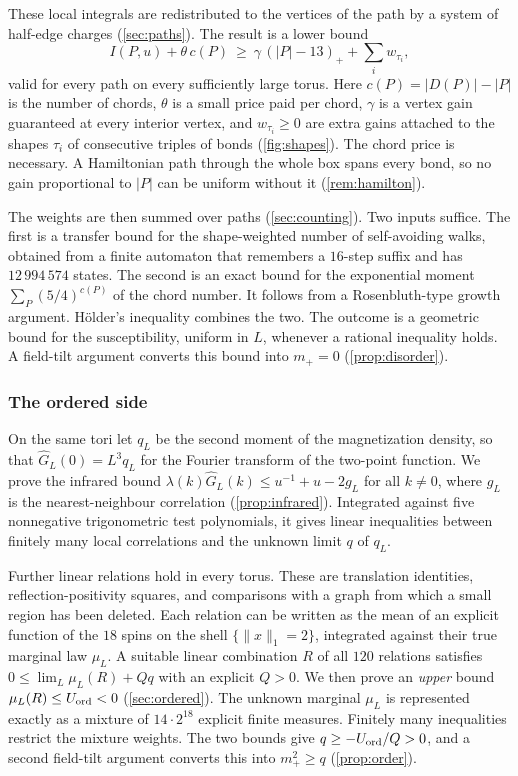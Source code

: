 These local integrals are redistributed to the vertices of the path by a system of half-edge charges (\cref{sec:paths}). The result is a lower bound
\[
 I(P,u)+\theta\,c(P)\ \ge\ \gamma\,(|P|-13)_+ +\sum_i w_{\tau_i},
\]
valid for every path on every sufficiently large torus. Here $c(P)=|D(P)|-|P|$ is the number of chords, $\theta$ is a small price paid per chord, $\gamma$ is a vertex gain guaranteed at every interior vertex, and $w_{\tau_i}\ge0$ are extra gains attached to the shapes $\tau_i$ of consecutive triples of bonds (\cref{fig:shapes}). The chord price is necessary. A Hamiltonian path through the whole box spans every bond, so no gain proportional to $|P|$ can be uniform without it (\cref{rem:hamilton}).

The weights are then summed over paths (\cref{sec:counting}). Two inputs suffice. The first is a transfer bound for the shape-weighted number of self-avoiding walks, obtained from a finite automaton that remembers a $16$-step suffix and has $12\,994\,574$ states. The second is an exact bound for the exponential moment $\sum_P(5/4)^{c(P)}$ of the chord number. It follows from a Rosenbluth-type growth argument. H\"older's inequality combines the two. The outcome is a geometric bound for the susceptibility, uniform in $L$, whenever a rational inequality holds. A field-tilt argument converts this bound into $m_+=0$ (\cref{prop:disorder}).

\subsubsection*{The ordered side}
On the same tori let $q_L$ be the second moment of the magnetization density, so that $\widehat G_L(0)=L^3q_L$ for the Fourier transform of the two-point function. We prove the infrared bound $\lambda(k)\widehat G_L(k)\le u^{-1}+u-2g_L$ for all $k\ne0$, where $g_L$ is the nearest-neighbour correlation (\cref{prop:infrared}). Integrated against five nonnegative trigonometric test polynomials, it gives linear inequalities between finitely many local correlations and the unknown limit $q$ of $q_L$.

Further linear relations hold in every torus. These are translation identities, reflection-positivity squares, and comparisons with a graph from which a small region has been deleted. Each relation can be written as the mean of an explicit function of the $18$ spins on the shell $\{\|x\|_1=2\}$, integrated against their true marginal law $\mu_L$. A suitable linear combination $R$ of all $120$ relations satisfies $0\le\lim_L\mu_L(R)+Qq$ with an explicit $Q>0$. We then prove an \emph{upper} bound $\mu_L(R)\le U_{\mathrm{ord}}<0$ (\cref{sec:ordered}). The unknown marginal $\mu_L$ is represented exactly as a mixture of $14\cdot2^{18}$ explicit finite measures. Finitely many inequalities restrict the mixture weights. The two bounds give $q\ge-U_{\mathrm{ord}}/Q>0$, and a second field-tilt argument converts this into $m_+^2\ge q$ (\cref{prop:order}).

